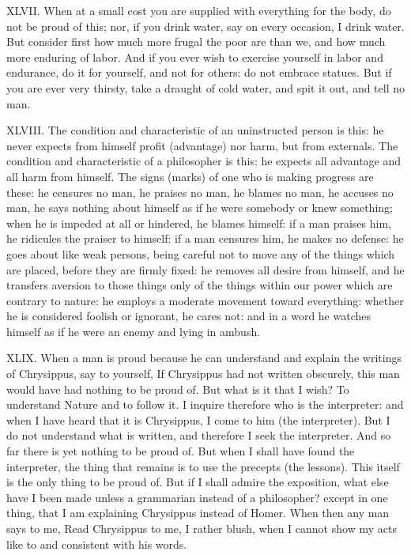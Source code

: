 XLVII. When at a small cost you are supplied with everything for the body, do not be proud of this; nor, if you drink water, say on every occasion, I drink water. But consider first how much more frugal the poor are than we, and how much more enduring of labor. And if you ever wish to exercise yourself in labor and endurance, do it for yourself, and not for others: do not embrace statues. But if you are ever very thirsty, take a draught of cold water, and spit it out, and tell no man.



XLVIII. The condition and characteristic of an uninstructed person is this: he never expects from himself profit (advantage) nor harm, but from externals. The condition and characteristic of a philosopher is this: he expects all advantage and all harm from himself. The signs (marks) of one who is making progress are these: he censures no man, he praises no man, he blames no man, he accuses no man, he says nothing about himself as if he were somebody or knew something; when he is impeded at all or hindered, he blames himself: if a man praises him, he ridicules the praiser to himself: if a man censures him, he makes no defense: he goes about like weak persons, being careful not to move any of the things which are placed, before they are firmly fixed: he removes all desire from himself, and he transfers aversion to those things only of the things within our power which are contrary to nature: he employs a moderate movement toward everything: whether he is considered foolish or ignorant, he cares not: and in a word he watches himself as if he were an enemy and lying in ambush.



XLIX. When a man is proud because he can understand and explain the writings of Chrysippus, say to yourself, If Chrysippus had not written obscurely, this man would have had nothing to be proud of. But what is it that I wish? To understand Nature and to follow it. I inquire therefore who is the interpreter: and when I have heard that it is Chrysippus, I come to him (the interpreter). But I do not understand what is written, and therefore I seek the interpreter. And so far there is yet nothing to be proud of. But when I shall have found the interpreter, the thing that remains is to use the precepts (the lessons). This itself is the only thing to be proud of. But if I shall admire the exposition, what else have I been made unless a grammarian instead of a philosopher? except in one thing, that I am explaining Chrysippus instead of Homer. When then any man says to me, Read Chrysippus to me, I rather blush, when I cannot show my acts like to and consistent with his words.



